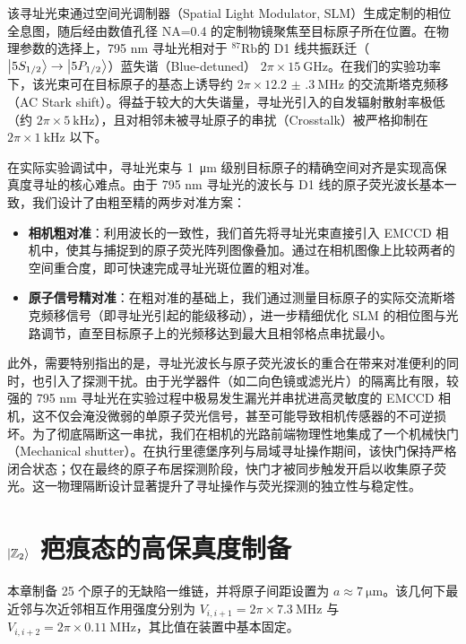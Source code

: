 \documentclass[../main.tex]{subfiles}
\begin{document}
该寻址光束通过空间光调制器（Spatial Light Modulator, SLM）生成定制的相位全息图，随后经由数值孔径 NA=0.4 的定制物镜聚焦至目标原子所在位置。在物理参数的选择上，795 nm 寻址光相对于 $^{87}\mathrm{Rb}$的 D1 线共振跃迁（$\ket{5S_{1/2}}\rightarrow\ket{5P_{1/2}}$）蓝失谐（Blue-detuned） $2\pi \times \SI{15}{\GHz}$。在我们的实验功率下，该光束可在目标原子的基态上诱导约 $2\pi \times \SI{12.2(3)}{\MHz}$ 的交流斯塔克频移（AC Stark shift）。得益于较大的大失谐量，寻址光引入的自发辐射散射率极低（约 $2\pi \times \SI{5}{\kHz}$），且对相邻未被寻址原子的串扰（Crosstalk）被严格抑制在 $2\pi \times \SI{1}{\kHz}$ 以下。

在实际实验调试中，寻址光束与 \SI{1}{\micro\meter} 级别目标原子的精确空间对齐是实现高保真度寻址的核心难点。由于 795 nm 寻址光的波长与 D1 线的原子荧光波长基本一致，我们设计了由粗至精的两步对准方案：
\begin{itemize}
    \item \textbf{相机粗对准}：利用波长的一致性，我们首先将寻址光束直接引入 EMCCD 相机中，使其与捕捉到的原子荧光阵列图像叠加。通过在相机图像上比较两者的空间重合度，即可快速完成寻址光斑位置的粗对准。
    \item \textbf{原子信号精对准}：在粗对准的基础上，我们通过测量目标原子的实际交流斯塔克频移信号（即寻址光引起的能级移动），进一步精细优化 SLM 的相位图与光路调节，直至目标原子上的光频移达到最大且相邻格点串扰最小。
\end{itemize}


此外，需要特别指出的是，寻址光波长与原子荧光波长的重合在带来对准便利的同时，也引入了探测干扰。由于光学器件（如二向色镜或滤光片）的隔离比有限，较强的 795 nm 寻址光在实验过程中极易发生漏光并串扰进高灵敏度的 EMCCD 相机，这不仅会淹没微弱的单原子荧光信号，甚至可能导致相机传感器的不可逆损坏。为了彻底隔断这一串扰，我们在相机的光路前端物理性地集成了一个机械快门（Mechanical shutter）。在执行里德堡序列与局域寻址操作期间，该快门保持严格闭合状态；仅在最终的原子布居探测阶段，快门才被同步触发开启以收集原子荧光。这一物理隔断设计显著提升了寻址操作与荧光探测的独立性与稳定性。



\section{$\ket{\mathbb{Z}_2}$ 疤痕态的高保真度制备}
本章制备 25 个原子的无缺陷一维链，并将原子间距设置为 $a\approx\SI{7}{\micro\meter}$。该几何下最近邻与次近邻相互作用强度分别为 $V_{i,i+1}=2\pi\times\SI{7.3}{\MHz}$ 与 $V_{i,i+2}=2\pi\times\SI{0.11}{\MHz}$，其比值在装置中基本固定。
\end{document}
